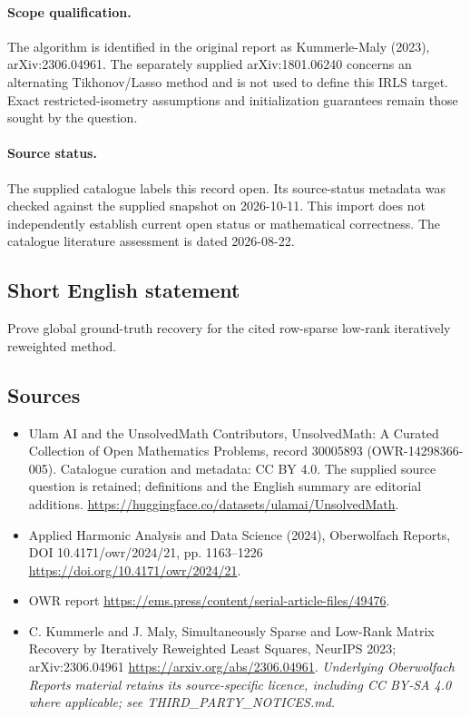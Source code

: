 \documentclass[11pt]{article}
\begin{document}
\paragraph{Scope qualification.}
The algorithm is identified in the original report as Kummerle-Maly (2023), arXiv:2306.04961. The separately supplied arXiv:1801.06240 concerns an alternating Tikhonov/Lasso method and is not used to define this IRLS target. Exact restricted-isometry assumptions and initialization guarantees remain those sought by the question.
\paragraph{Source status.}
The supplied catalogue labels this record open. Its source-status metadata was checked against the supplied snapshot on 2026-10-11. This import does not independently establish current open status or mathematical correctness. The catalogue literature assessment is dated 2026-08-22.
\subsection{Short English statement}
Prove global ground-truth recovery for the cited row-sparse low-rank iteratively reweighted method.
\subsection{Sources}
\begin{itemize}
\item[\hypertarget{source:30005893:1}{S1}] Ulam AI and the UnsolvedMath Contributors, UnsolvedMath: A Curated Collection of Open Mathematics Problems, record 30005893 (OWR-14298366-005). Catalogue curation and metadata: CC BY 4.0. The supplied source question is retained; definitions and the English summary are editorial additions.
\url{https://huggingface.co/datasets/ulamai/UnsolvedMath}.
\item[\hypertarget{source:30005893:2}{S2}] Applied Harmonic Analysis and Data Science (2024), Oberwolfach Reports, DOI 10.4171/owr/2024/21, pp. 1163--1226
\url{https://doi.org/10.4171/owr/2024/21}.
\item[\hypertarget{source:30005893:3}{S3}] OWR report
\url{https://ems.press/content/serial-article-files/49476}.
\item[\hypertarget{source:30005893:4}{S4}] C. Kummerle and J. Maly, Simultaneously Sparse and Low-Rank Matrix Recovery by Iteratively Reweighted Least Squares, NeurIPS 2023; arXiv:2306.04961
\url{https://arxiv.org/abs/2306.04961}.
\textit{Underlying Oberwolfach Reports material retains its source-specific licence, including CC BY-SA 4.0 where applicable; see THIRD\_PARTY\_NOTICES.md.}
\end{itemize}
\end{document}
